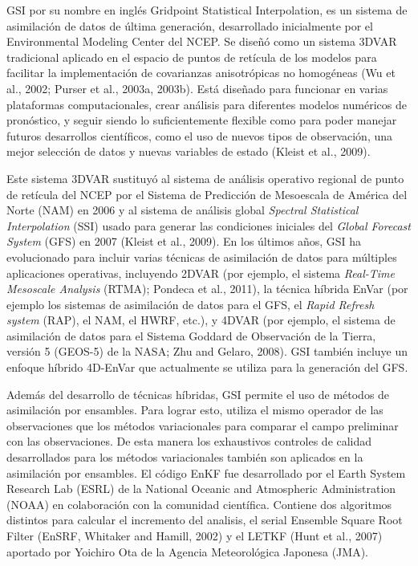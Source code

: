 \documentclass[12pt,oneside,a4paper]{reedthesis}
\begin{document}
GSI por su nombre en inglés Gridpoint Statistical Interpolation, es un sistema de asimilación de datos de última generación, desarrollado inicialmente por el Environmental Modeling Center del NCEP. Se diseñó como un sistema 3DVAR tradicional aplicado en el espacio de puntos de retícula de los modelos para facilitar la implementación de covarianzas anisotrópicas no homogéneas (Wu et al., 2002; Purser et al., 2003a, 2003b).
Está diseñado para funcionar en varias plataformas computacionales, crear análisis para diferentes modelos numéricos de pronóstico, y seguir siendo lo suficientemente flexible como para poder manejar futuros desarrollos científicos, como el uso de nuevos tipos de observación, una mejor selección de datos y nuevas variables de estado (Kleist et al., 2009).

Este sistema 3DVAR sustituyó al sistema de análisis operativo regional de punto de retícula del NCEP por el Sistema de Predicción de Mesoescala de América del Norte (NAM) en 2006 y al sistema de análisis global \emph{Spectral Statistical Interpolation} (SSI) usado para generar las condiciones iniciales del \emph{Global Forecast System} (GFS) en 2007 (Kleist et al., 2009).
En los últimos años, GSI ha evolucionado para incluir varias técnicas de asimilación de datos para múltiples aplicaciones operativas, incluyendo 2DVAR (por ejemplo, el sistema \emph{Real-Time Mesoscale Analysis} (RTMA); Pondeca et al., 2011), la técnica híbrida EnVar (por ejemplo los sistemas de asimilación de datos para el GFS, el \emph{Rapid Refresh system} (RAP), el NAM, el HWRF, etc.), y 4DVAR (por ejemplo, el sistema de asimilación de datos para el Sistema Goddard de Observación de la Tierra, versión 5 (GEOS-5) de la NASA; Zhu and Gelaro, 2008).
GSI también incluye un enfoque híbrido 4D-EnVar que actualmente se utiliza para la generación del GFS.

Además del desarrollo de técnicas híbridas, GSI permite el uso de métodos de asimilación por ensambles. Para lograr esto, utiliza el mismo operador de las observaciones que los métodos variacionales para comparar el campo preliminar con las observaciones.
De esta manera los exhaustivos controles de calidad desarrollados para los métodos variacionales también son aplicados en la asimilación por ensambles.
El código EnKF fue desarrollado por el Earth System Research Lab (ESRL) de la National Oceanic and Atmospheric Administration (NOAA) en colaboración con la comunidad científica.
Contiene dos algoritmos distintos para calcular el incremento del analisis, el serial Ensemble Square Root Filter (EnSRF, Whitaker and Hamill, 2002) y el LETKF (Hunt et al., 2007) aportado por Yoichiro Ota de la Agencia Meteorológica Japonesa (JMA).
\end{document}
